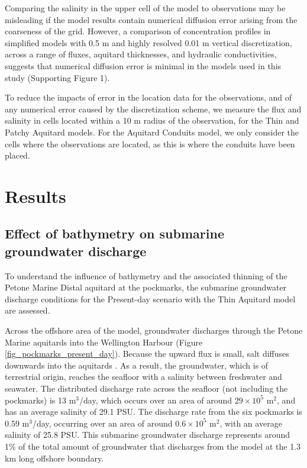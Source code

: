 \documentclass[draft, 10pt]{agujournal2019}
\begin{document}
Comparing the salinity in the upper cell of the model to observations may be misleading if the model results contain numerical diffusion error arising from the coarseness of the grid. However, a comparison of concentration profiles in simplified models with 0.5 m and highly resolved 0.01 m vertical discretization, across a range of fluxes, aquitard thicknesses, and hydraulic conductivities, suggests that numerical diffusion error is minimal in the models used in this study (Supporting Figure 1).

To reduce the impacts of error in the location data for the observations, and of any numerical error caused by the discretization scheme, we measure the flux and salinity in cells located within a 10 m radius of the observation, for the Thin and Patchy Aquitard models. For the Aquitard Conduits model, we only consider the cells where the observations are located, as this is where the conduits have been placed.


\section{Results}

\subsection{Effect of bathymetry on submarine groundwater discharge}

To understand the  influence of bathymetry and the associated thinning of the Petone Marine Distal aquitard at the pockmarks, the submarine groundwater discharge conditions for the Present-day scenario with the Thin Aquitard model are assessed. 

Across the offshore area of the model, groundwater discharges through the Petone Marine aquitards into the Wellington Harbour (Figure \ref{fig_pockmarks_present_day}). Because the upward flux is small, salt diffuses downwards into the aquitards \cite{jiao_reconstructed_2015}. As a result, the groundwater, which is of terrestrial origin, reaches the seafloor with a salinity between freshwater and seawater. The distributed discharge rate across the seafloor (not including the pockmarks) is 13 m$^3$/day, which occurs over an area of around $29 \times10^{5}$ m$^2$, and has an average salinity of 29.1 PSU. The discharge rate from the six pockmarks is 0.59 m$^3$/day, occurring over an area of around $0.6\times10^{5}$ m$^2$, with an average salinity of 25.8 PSU. This submarine groundwater discharge represents around 1\% of the total amount of groundwater that discharges from the model at the 1.3 km long offshore boundary.
\end{document}
